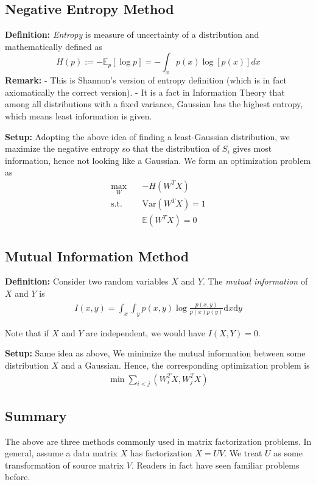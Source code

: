 \subsection{Negative Entropy Method}
\textbf{Definition:} \textit{Entropy} is measure of uncertainty of a distribution and mathematically defined as $$H(p):=-\mathbb{E}_p[\log p]=-\int_x p(x)\log [p(x)]dx$$ \textbf{Remark: } \newline - This is Shannon's version of entropy definition (which is in fact axiomatically the correct version). 
\newline - It is a fact in Information Theory that among all distributions with a fixed variance, Gaussian has the highest entropy, which means least information is given.

\textbf{Setup: }\newline
Adopting the above idea of finding a least-Gaussian distribution, we maximize the negative entropy so that the distribution of $S_i$ gives most information, hence not looking like a Gaussian. We form an optimization problem as
\begin{align*}
    \max_W \quad & -H(W^TX) \\
    \text{s.t.} \quad & \text{Var}(W^TX)=1 \\
                \quad & \mathbb{E}(W^TX) = 0
\end{align*}


\subsection{Mutual Information Method}
\textbf{Definition: } Consider two random variables $X$ and $Y$. The \textit{mutual information} of $X$ and $Y$ is \begin{align*}
    I(x,y) = \int _x \int _y p(x,y) \log \frac{p(x,y)}{p(x)p(y)} \text{d}x \text{d}y
\end{align*}

Note that if $X$ and $Y$ are independent, we would have $I(X,Y) = 0$.

\textbf{Setup:}
Same idea as above, We minimize the mutual information between some distribution $X$ and a Gaussian. Hence, the corresponding optimization problem is
\begin{align*}
    \min \sum _{i<j} (W_i^TX,W^T_jX)
\end{align*}

\subsection{Summary}
The above are three methods commonly used in matrix factorization problems. In general, assume a data matrix $X$ has factorization $X = UV$. We treat $U$ as some transformation of source matrix $V$. Readers in fact have seen familiar problems before. 

